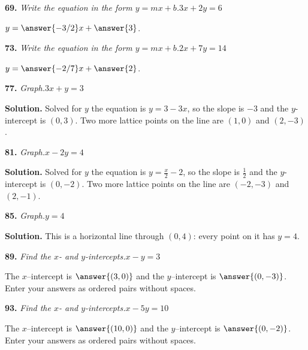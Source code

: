 \documentclass{ximera}
\begin{document}
\begin{problem}
\textbf{69.} \emph{Write the equation in the form $y = mx + b$.}\quad $3x + 2y = 6$

$y = \answer{-3/2}x + \answer{3}$.
\end{problem}

\begin{problem}
\textbf{73.} \emph{Write the equation in the form $y = mx + b$.}\quad $2x + 7y = 14$

$y = \answer{-2/7}x + \answer{2}$.
\end{problem}

\begin{problem}
\textbf{77.} \emph{Graph.}\quad $3x + y = 3$   \figbox{\gridsm}

\begin{hint}
\textbf{Solution.} Solved for $y$ the equation is $y=3 - 3x$, so the slope is $-3$ and the $y$-intercept is $(0,3)$. Two more lattice points on the line are $(1,0)$ and $(2,-3)$.
\end{hint}
\end{problem}

\begin{problem}
\textbf{81.} \emph{Graph.}\quad $x - 2y = 4$   \figbox{\gridsm}

\begin{hint}
\textbf{Solution.} Solved for $y$ the equation is $y=\frac{x}{2} - 2$, so the slope is $\frac{1}{2}$ and the $y$-intercept is $(0,-2)$. Two more lattice points on the line are $(-2,-3)$ and $(2,-1)$.
\end{hint}
\end{problem}

\begin{problem}
\textbf{85.} \emph{Graph.}\quad $y = 4$        \figbox{\gridsm}

\begin{hint}
\textbf{Solution.} This is a horizontal line through $(0,4)$: every point on it has $y=4$.
\end{hint}
\end{problem}

\begin{problem}
\textbf{89.} \emph{Find the $x$- and $y$-intercepts.}\quad $x - y = 3$

The \(x\)--intercept is $\answer{(3,0)}$ and the \(y\)--intercept is $\answer{(0,-3)}$. 
Enter your answers as ordered pairs without spaces.
\end{problem}

\begin{problem}
\textbf{93.} \emph{Find the $x$- and $y$-intercepts.}\quad $x - 5y = 10$

The \(x\)--intercept is $\answer{(10,0)}$ and the \(y\)--intercept is $\answer{(0,-2)}$. 
Enter your answers as ordered pairs without spaces.
\end{problem}
\end{document}
